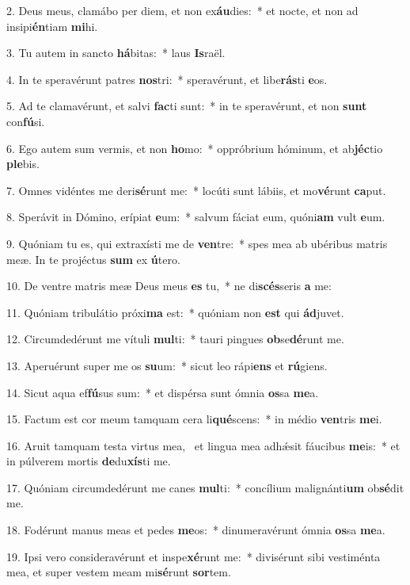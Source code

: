 2. Deus meus, clamábo per diem, et non ex\textbf{áu}dies:~*  et nocte, et non ad insipi\textbf{én}tiam \textbf{mi}hi.\

3. Tu autem in sancto \textbf{há}bitas:~*  laus \textbf{Is}raël.\

4. In te speravérunt patres \textbf{nos}tri:~*  speravérunt, et libe\textbf{rás}ti \textbf{e}os.\

5. Ad te clamavérunt, et salvi \textbf{fac}ti sunt:~*  in te speravérunt, et non \textbf{sunt} con\textbf{fú}si.\

6. Ego autem sum vermis, et non \textbf{ho}mo:~*  oppróbrium hóminum, et ab\textbf{jéc}tio \textbf{ple}bis.\

7. Omnes vidéntes me deri\textbf{sé}runt me:~*  locúti sunt lábiis, et mo\textbf{vé}runt \textbf{ca}put.\

8. Sperávit in Dómino, erípiat \textbf{e}um:~*  salvum fáciat eum, quóni\textbf{am} vult \textbf{e}um.\

9. Quóniam tu es, qui extraxísti me de \textbf{ven}tre:~*  spes mea ab ubéribus matris meæ. In te projéctus \textbf{sum} ex \textbf{ú}tero.\

10. De ventre matris meæ Deus meus \textbf{es} tu,~*  ne di\textbf{scés}seris \textbf{a} me:\

11. Quóniam tribulátio próxi\textbf{ma} est:~*  quóniam non \textbf{est} qui \textbf{ád}juvet.\

12. Circumdedérunt me vítuli \textbf{mul}ti:~*  tauri pingues \textbf{ob}se\textbf{dé}runt me.\

13. Aperuérunt super me os \textbf{su}um:~*  sicut leo rápi\textbf{ens} et \textbf{rú}giens.\

14. Sicut aqua ef\textbf{fú}sus sum:~*  et dispérsa sunt ómnia \textbf{os}sa \textbf{me}a.\

15. Factum est cor meum tamquam cera li\textbf{qué}scens:~*  in médio \textbf{ven}tris \textbf{me}i.\

16. Aruit tamquam testa virtus mea, \dag\  et lingua mea adhǽsit fáucibus \textbf{me}is:~*  et in púlverem mortis \textbf{de}du\textbf{xís}ti me.\

17. Quóniam circumdedérunt me canes \textbf{mul}ti:~*  concílium malignánti\textbf{um} ob\textbf{sé}dit me.\

18. Fodérunt manus meas et pedes \textbf{me}os:~*  dinumeravérunt ómnia \textbf{os}sa \textbf{me}a.\

19. Ipsi vero consideravérunt et inspe\textbf{xé}runt me:~*  divisérunt sibi vestiménta mea, et super vestem meam mi\textbf{sé}runt \textbf{sor}tem.\

